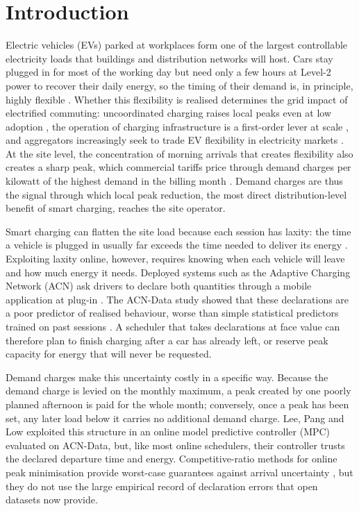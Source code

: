 \section{Introduction}\label{sec:intro}
Electric vehicles (EVs) parked at workplaces form one of the largest controllable electricity loads that buildings and distribution networks will host. Cars stay plugged in for most of the working day but need only a few hours at Level-2 power to recover their daily energy, so the timing of their demand is, in principle, highly flexible \cite{Lee2019ACNData,Schuller2015Flex,Develder2016Flex}. Whether this flexibility is realised determines the grid impact of electrified commuting: uncoordinated charging raises local peaks even at low adoption \cite{Muratori2018Uncoordinated,ClementNyns2010,Gong2012Transformer}, the operation of charging infrastructure is a first-order lever at scale \cite{Powell2022Infrastructure,Crozier2020SmartCharging,Mangipinto2022Europe}, and aggregators increasingly seek to trade EV flexibility in electricity markets \cite{Chemudupaty2025Intraday,Chemudupaty2025SpotMarkets}. At the site level, the concentration of morning arrivals that creates flexibility also creates a sharp peak, which commercial tariffs price through demand charges per kilowatt of the highest demand in the billing month \cite{Lee2020Pricing}. Demand charges are thus the signal through which local peak reduction, the most direct distribution-level benefit of smart charging, reaches the site operator.

Smart charging can flatten the site load because each session has laxity: the time a vehicle is plugged in usually far exceeds the time needed to deliver its energy \cite{Lee2019ACNData,Nakahira2017sLLF}. Exploiting laxity online, however, requires knowing when each vehicle will leave and how much energy it needs. Deployed systems such as the Adaptive Charging Network (ACN) ask drivers to declare both quantities through a mobile application at plug-in \cite{Lee2021ACN}. The ACN-Data study showed that these declarations are a poor predictor of realised behaviour, worse than simple statistical predictors trained on past sessions \cite{Lee2019ACNData}. A scheduler that takes declarations at face value can therefore plan to finish charging after a car has already left, or reserve peak capacity for energy that will never be requested.

Demand charges make this uncertainty costly in a specific way. Because the demand charge is levied on the monthly maximum, a peak created by one poorly planned afternoon is paid for the whole month; conversely, once a peak has been set, any later load below it carries no additional demand charge. Lee, Pang and Low \cite{Lee2020Pricing} exploited this structure in an online model predictive controller (MPC) evaluated on ACN-Data, but, like most online schedulers, their controller trusts the declared departure time and energy. Competitive-ratio methods for online peak minimisation provide worst-case guarantees against arrival uncertainty \cite{Zhao2017RobustOnline}, but they do not use the large empirical record of declaration errors that open datasets now provide.

